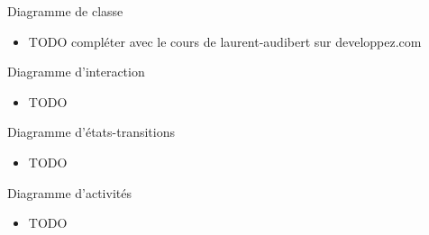 \documentclass[14pt]{beamer}
\begin{document}
\begin{framentitle}{Diagramme de classe}
    \begin{itemize}
        \item TODO compléter avec le cours de laurent-audibert sur
            developpez.com
    \end{itemize}
\end{framentitle}

\begin{framentitle}{Diagramme d'interaction}
    \begin{itemize}
        \item TODO
    \end{itemize}
\end{framentitle}

\begin{framentitle}{Diagramme d'états-transitions}
    \begin{itemize}
        \item TODO
    \end{itemize}
\end{framentitle}

\begin{framentitle}{Diagramme d'activités}
    \begin{itemize}
        \item TODO
    \end{itemize}
\end{framentitle}
\end{document}
